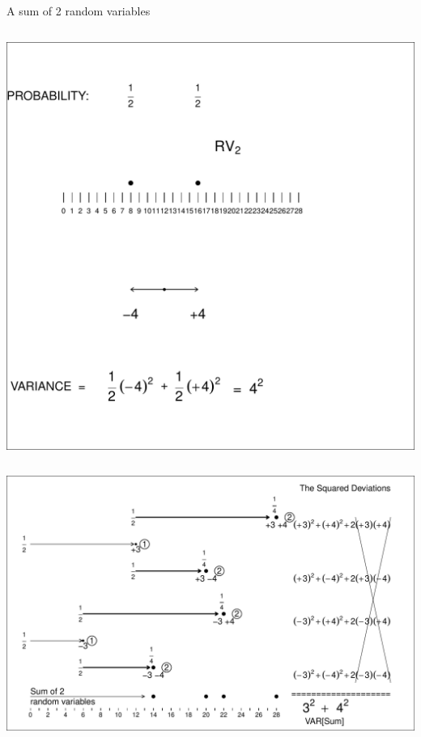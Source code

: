\documentclass[10pt,handout]{beamer}\usepackage[]{graphicx}\usepackage[]{color}
\makeatletter
\def\maxwidth{ %
  \ifdim\Gin@nat@width>\linewidth
    \linewidth
  \else
    \Gin@nat@width
  \fi
}
\newenvironment{knitrout}{}{} %
\makeatother
\begin{document}
\begin{frame}[fragile]{A sum of 2 random variables}
\begin{columns}
\begin{column}{0.5\textwidth}
\begin{knitrout}
{\centering \includegraphics[width=1\linewidth]{figure/unnamed-chunk-9-1} 

}


\end{knitrout}
	\end{column}
	\end{columns}
	
\end{frame}

\begin{frame}
\begin{knitrout}\tiny
{}\color{fgcolor}

{\centering \includegraphics[width=\maxwidth]{figure/unnamed-chunk-10-1} 

}


\end{knitrout}

\end{frame}
\end{document}
